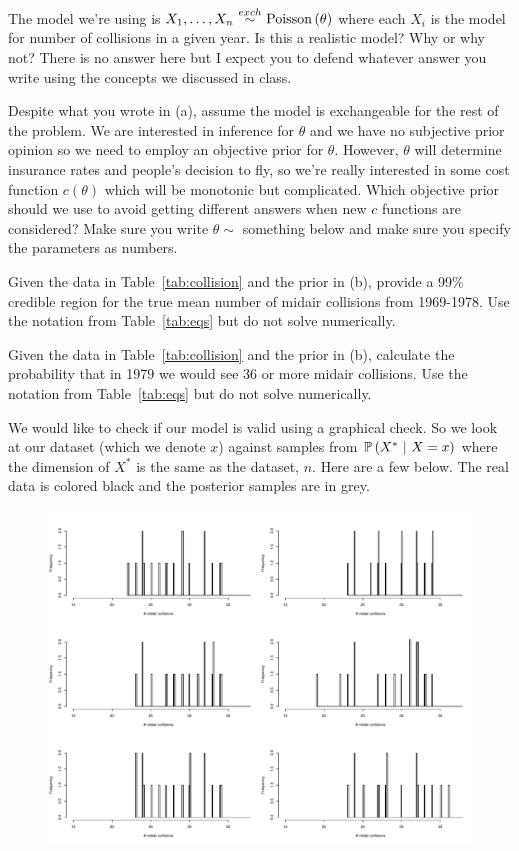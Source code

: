 \documentclass[12pt]{article}
\newcommand{\exchdist}{~{\buildrel exch \over \sim}~}
\begin{document}
\benum

 The model we're using is $X_1, \ldots, X_n \exchdist \poisson{\theta}$ where each $X_i$ is the model for number of collisions in a given year. Is this a realistic model? Why or why not? There is no  answer here but I expect you to defend whatever answer you write using the concepts we discussed in class.

 Despite what you wrote in (a), assume the model is exchangeable for the rest of the problem. We are interested in inference for $\theta$ and we have no subjective prior opinion so we need to employ an objective prior for $\theta$. However, $\theta$ will determine insurance rates and people's decision to fly, so we're really interested in some cost function $c(\theta)$ which will be monotonic but complicated. Which objective prior should we use to avoid getting different answers when new $c$ functions are considered? Make sure you write $\theta \sim$ something below and make sure you specify the parameters as numbers.

 Given the data in Table~\ref{tab:collision} and the prior in (b), provide a 99\% credible region for the true mean number of midair collisions from 1969-1978. Use the notation from Table~\ref{tab:eqs} but do not solve numerically.

 Given the data in Table~\ref{tab:collision} and the prior in (b), calculate the probability that in 1979 we would see 36 or more midair collisions. Use the notation from Table~\ref{tab:eqs} but do not solve numerically.

 We would like to check if our model is valid using a graphical check. So we look at our dataset (which we denote $x$) against samples from $\mathbb{P}\left(X^*~|~X = x\right)$ where the dimension of $X^*$ is the same as the dataset, $n$. Here are a few below. The real data is colored black and the posterior samples are in grey.

\begin{figure}[htp]
\centering
\includegraphics[width=7in]{ppp}
\end{figure}
\end{document}
